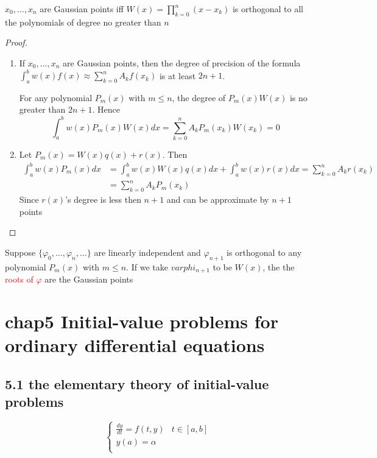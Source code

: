 \documentclass[11pt]{article}
\begin{document}
\begin{theorem}
$x_0,\dots,x_n$ are Gaussian points iff $W(x)=\displaystyle\prod_{k=0}^n(x-x_k)$
is orthogonal to all the polynomials of degree no greater than $n$
\end{theorem}
\begin{proof}
\begin{enumerate}
\item If $x_0,\dots,x_n$ are Gaussian points, then the degree of precision of
the formula $\int_a^bw(x)f(x)\approx \displaystyle\sum_{k=0}^nA_kf(x_k)$ is
at least $2n+1$.

For any polynomial $P_m(x)$ with $m\le n$, the degree of $P_m(x)W(x)$ is no greater
than $2n+1$. Hence
\begin{equation*}
\int_a^bw(x)P_m(x)W(x)dx=\displaystyle\sum_{k=0}^nA_kP_m(x_k)W(x_k)=0
\end{equation*}

\item Let $P_m(x)=W(x)q(x)+r(x)$. Then
\begin{align*}
\int_a^bw(x)P_m(x)dx&=\int_a^bw(x)W(x)q(x)dx+\int_a^bw(x)r(x)dx=
\displaystyle\sum_{k=0}^nA_kr(x_k)\\&=\displaystyle\sum_{k=0}^nA_kP_m(x_k)
\end{align*}
Since $r(x)$'s degree is less then $n+1$ and can be approximate by $n+1$ points

\end{enumerate}
\end{proof}

Suppose \(\{\varphi_0,\dots,\varphi_n,\dots\}\) are linearly independent and
\(\varphi_{n+1}\) is orthogonal to any polynomial \(P_m(x)\) with \(m\le n\). If we
take \(varphi_{n+1}\) to be \(W(x)\), the the \textcolor{red}{roots of $\varphi$}
are the Gaussian points
\section{chap5 Initial-value problems for ordinary differential equations}
\label{sec:orgbd1f09b}
\subsection{5.1 the elementary theory of initial-value problems}
\label{sec:org4b67aaa}
\begin{equation*}
\begin{cases}
\frac{dy}{dt}=f(t,y)&t\in[a,b]\\
y(a)=\alpha\\
\end{cases}
\end{equation*}
\end{document}
